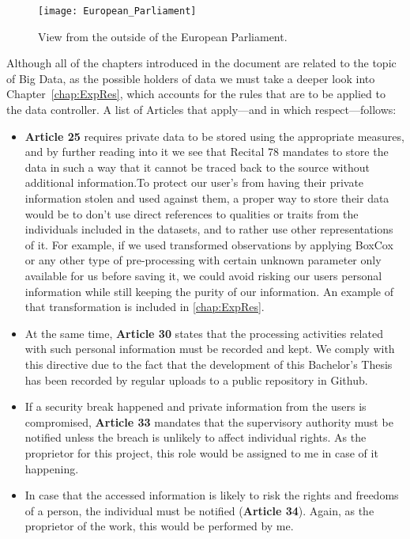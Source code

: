 \begin{figure}[H]
	\caption{View from the outside of the European Parliament.}
	\label{fig:European_Parliament}
	\texttt{[image: European\_Parliament]}
\end{figure}

Although all of the chapters introduced in the document are related to the topic of Big Data, as the possible holders of data we must take a deeper look into Chapter~\ref{chap:ExpRes}, which accounts for the rules that are to be applied to the data controller. 
%
A list  of Articles that apply---and in which respect---follows:
%
\begin{itemize}
	\item \textbf{Article 25} requires private data to be stored using the appropriate measures, and by further reading into it we see that Recital 78 mandates to store the data in such a way that it cannot be traced back to the source without additional information.To protect our user's from having their private information stolen and used against them, a proper way to store their data would be to don't use direct references to qualities or traits from the individuals included in the datasets, and to rather use other representations of it. For example, if we used transformed observations by applying BoxCox or any other type of pre-processing with certain unknown parameter only available for us before saving it, we could avoid risking our users personal information while still keeping the purity of our information. An example of that transformation is included in \autoref{chap:ExpRes}.
	
	\item At the same time, \textbf{Article 30} states that the processing activities related with such personal information must be recorded and kept. We comply with this directive due to the fact that the development of this Bachelor's Thesis has been recorded by regular uploads to a public repository in Github.
	
	\item  If a security break happened and private information from the users is compromised, \textbf{Article 33} mandates that the supervisory authority must be notified unless the breach is unlikely to affect individual rights. As the proprietor for this project, this role would be assigned to me in case of it happening.
	
	\item In case that the accessed information is likely to risk the rights and freedoms of a person, the individual must be notified (\textbf{Article 34}). Again, as the proprietor of the work, this would be performed by me. 
	

\end{itemize}
